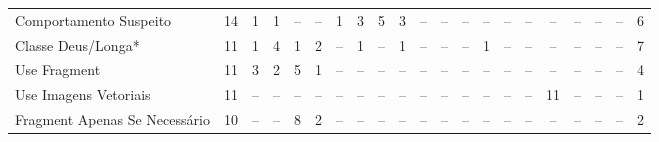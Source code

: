 \begin{table*}[t]
\begin{tabular}{@{}p{3.8cm}p{0.3cm}p{.2cm}p{.2cm}p{.2cm}p{.2cm}p{.2cm}p{.2cm}p{.2cm}p{.2cm}p{.2cm}p{.4cm}p{.4cm}p{.4cm}p{.4cm}p{.4cm}p{.4cm}p{.4cm}p{.4cm}p{.4cm}p{0.2cm}@{}}
Comportamento Suspeito						& \multicolumn{1}{c}{14} 	& \multicolumn{1}{c}{1} 	& \multicolumn{1}{c}{1} 	& \multicolumn{1}{c}{--} 	& \multicolumn{1}{c}{--} 	& \multicolumn{1}{c}{1} 	& \multicolumn{1}{c}{3} 	& \multicolumn{1}{c}{5} 	& \multicolumn{1}{c}{3} 	& \multicolumn{1}{c}{--} 	& \multicolumn{1}{c}{--} 	& \multicolumn{1}{c}{--} 	& \multicolumn{1}{c}{--} 	& \multicolumn{1}{c}{--} 	& \multicolumn{1}{c}{--} 	& \multicolumn{1}{c}{--} 	& \multicolumn{1}{c}{--} 	& \multicolumn{1}{c}{--} 	& \multicolumn{1}{c}{--} 	& \multicolumn{1}{c}{6} \\
Classe Deus/Longa*							& \multicolumn{1}{c}{11} 	& \multicolumn{1}{c}{1} 	& \multicolumn{1}{c}{4} 	& \multicolumn{1}{c}{1} 	& \multicolumn{1}{c}{2} 	& \multicolumn{1}{c}{--} 	& \multicolumn{1}{c}{1} 	& \multicolumn{1}{c}{--} 	& \multicolumn{1}{c}{1} 	& \multicolumn{1}{c}{--} 	& \multicolumn{1}{c}{--} 	& \multicolumn{1}{c}{--} 	& \multicolumn{1}{c}{1} 	& \multicolumn{1}{c}{--} 	& \multicolumn{1}{c}{--} 	& \multicolumn{1}{c}{--} 	& \multicolumn{1}{c}{--} 	& \multicolumn{1}{c}{--} 	& \multicolumn{1}{c}{--} 	& \multicolumn{1}{c}{7} \\
Use Fragment								& \multicolumn{1}{c}{11} 	& \multicolumn{1}{c}{3} 	& \multicolumn{1}{c}{2} 	& \multicolumn{1}{c}{5} 	& \multicolumn{1}{c}{1} 	& \multicolumn{1}{c}{--} 	& \multicolumn{1}{c}{--} 	& \multicolumn{1}{c}{--} 	& \multicolumn{1}{c}{--} 	& \multicolumn{1}{c}{--} 	& \multicolumn{1}{c}{--} 	& \multicolumn{1}{c}{--} 	& \multicolumn{1}{c}{--} 	& \multicolumn{1}{c}{--} 	& \multicolumn{1}{c}{--} 	& \multicolumn{1}{c}{--} 	& \multicolumn{1}{c}{--} 	& \multicolumn{1}{c}{--} 	& \multicolumn{1}{c}{--} 	& \multicolumn{1}{c}{4} \\
Use Imagens Vetoriais						& \multicolumn{1}{c}{11} 	& \multicolumn{1}{c}{--} 	& \multicolumn{1}{c}{--} 	& \multicolumn{1}{c}{--} 	& \multicolumn{1}{c}{--} 	& \multicolumn{1}{c}{--} 	& \multicolumn{1}{c}{--} 	& \multicolumn{1}{c}{--} 	& \multicolumn{1}{c}{--} 	& \multicolumn{1}{c}{--} 	& \multicolumn{1}{c}{--} 	& \multicolumn{1}{c}{--} 	& \multicolumn{1}{c}{--} 	& \multicolumn{1}{c}{--} 	& \multicolumn{1}{c}{--} 	& \multicolumn{1}{c}{11} 	& \multicolumn{1}{c}{--} 	& \multicolumn{1}{c}{--} 	& \multicolumn{1}{c}{--} 	& \multicolumn{1}{c}{1} \\
Fragment Apenas Se Necess\'ario				& \multicolumn{1}{c}{10} 	& \multicolumn{1}{c}{--} 	& \multicolumn{1}{c}{--} 	& \multicolumn{1}{c}{8} 	& \multicolumn{1}{c}{2} 	& \multicolumn{1}{c}{--} 	& \multicolumn{1}{c}{--} 	& \multicolumn{1}{c}{--} 	& \multicolumn{1}{c}{--} 	& \multicolumn{1}{c}{--} 	& \multicolumn{1}{c}{--} 	& \multicolumn{1}{c}{--} 	& \multicolumn{1}{c}{--} 	& \multicolumn{1}{c}{--} 	& \multicolumn{1}{c}{--} 	& \multicolumn{1}{c}{--} 	& \multicolumn{1}{c}{--} 	& \multicolumn{1}{c}{--} 	& \multicolumn{1}{c}{--} 	& \multicolumn{1}{c}{2} \\

\end{tabular}
\end{table*}
